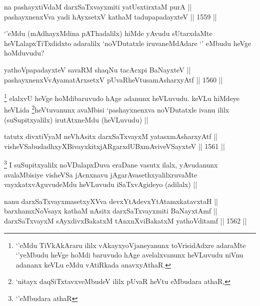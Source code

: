 \begin{shl}
na pashayxtiVdaM darxSaTxvayxmiti yatUsxtirxtaM purA || \\
pashayxnenxVva yadi hAyxsetxV kathaM tadupapadayxteV ||  1559 ||  
\end{shl}

\begin{artha}
`\stext'eMdu (mAdhayxMdina pAThadalilx) hiMde yAvudu sUtarxdaMte heVLalapxTiTxdidxto adaralilx `noVDutatxle iruvaneMdAdare `\stext' eMbudu heVge hoMduvudu?
\end{artha}

\begin{shl}
yathoVpapadayxteV savaRM shaqNu tacAcxpi BaNayxteV || \\
pashayxnenxVvAyamatArx\s \s setxV pUvaRheVtusamAsharxyAtf ||  1560 ||  
\end{shl}

\begin{artha}
\footnote{`\stext'eMdu TiVkAkAraru ililx vAkayxyoVjaneyanunx toVrisidAdxre adaraMte `\stext'yeMbudu heVge hoMdi baruvudo hAge avelalxvanunx heVLuvudu niVnu adananx keVLu eMdu vAtiRkada anavxyAthaR.}
elalxvU heVge hoMdibaruvudo hAge adanunx heVLuvudu. keVLu hiMdeye heVLida \footnote{`nitayx daqSiTxtavxveMbudeV ililx pUvaR heVtu eMbudara athaR,}heVtuvanunx avaMbisi `pashayxnenxva noVDutatxle ivanu ililx (suSupitxyalilx) irutAtxneMdu (heVLuvudu) ||
\end{artha}


\begin{shl}
tatutx divxtiVyaM neVhAsitx darxSaTxvayxM yatasxmAsharxyAtf || \\
visheVSabudadhxyXBivayxkitxjARgarxdUBxmAviveVSayxteV ||  1561 ||  
\end{shl}

\begin{artha}
\footnote{`\stext'eMbudara athaR}
I suSupitxyalilx noVDalapxDuva eraDane vasutx ilalx, yAvudanunx avalaMbisiye visheVSa jAcnxnavu jAgarAvasethxyalilxruvaMte vayxkatxvAguvudeMdu heVLuvudu iSaTxvAgideyo (adilalx) ||
\end{artha}


\begin{shl}
nanu darxSaTxvayxmasetxyXVva devxYtAdevxYtAtamxkatavxtaH || \\
barxhamxNoV\s sayx kathaM nAsitx darxSaTxvayxmiti BaNayxtAmf || \\
darxSaTxvayxM sAyxdivxBakatxM tAnxnXviBakatxM yathoVditamf ||  1562 ||  
\end{shl}

